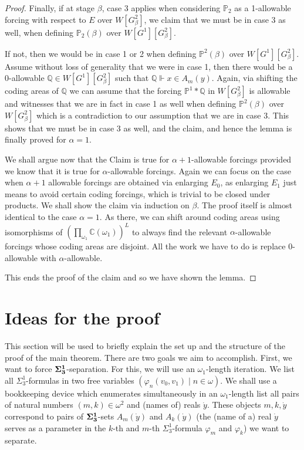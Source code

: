 \documentclass[a4paper,11pt]{article}
\newcommand{\forceP}{\mathbb{P}}
\newcommand{\forceQ}{\mathbb{Q}}
\begin{document}
\begin{proof}
Finally, if at stage $\beta$, case 3 applies when considering $\forceP_2$ as a 1-allowable forcing with respect to $E$ over $W[G^2_{\beta}]$, we claim that we must be in case 3 as well, when defining $\forceP_2 (\beta)$ over $W[G^1][G^2_{\beta}]$.

If not, then we would be in case 1 or 2 when defining $\forceP^2(
\beta)$ over $W[G^1][G^2_{\beta}]$. Assume without loss of generality that we were in case 1, then there would be a 0-allowable $\forceQ \in W[G^1][G^2_{\beta}]$ such that $\forceQ \Vdash x \in A_m(y)$. Again, via shifting the coding areas of $\forceQ$ we can assume that the forcing $\forceP^1 \ast\forceQ $ in $W[G^2_{\beta}]$ is allowable and witnesses that we are in fact in case 1 as well when defining  $\forceP^2(\beta)$ over $W[G^2_{\beta}]$ which is a contradiction to our assumption that we are in case 3. This shows that we must be in case 3 as well, and the claim, and hence the lemma is finally proved for $\alpha=1$.

 

\medskip

We shall argue now that the Claim is true for $\alpha+1$-allowable forcings provided we know that it is true for $\alpha$-allowable forcings. Again we can focus on the case when $\alpha+1$ allowable forcings are obtained via enlarging $E_0$, as enlarging $E_1$ just means to avoid certain coding forcings, which is trivial to be closed under products.
We shall show the claim via induction on $\beta$. The proof itself is almost identical to the case $\alpha=1$. As there, we can shift around coding areas using isomorphisms of $(\prod_{\omega_1} \mathbb{C} (\omega_1))^L$ to always find the relevant $\alpha$-allowable forcings whose coding areas are disjoint. All the work we have to do is replace $0$-allowable with $\alpha$-allowable.



This ends the proof of the claim and so we have shown the lemma.
\end{proof}
\section{Ideas for the proof}

This section will be used to briefly explain the set up and the structure of the proof of the main theorem.
There are two goals we aim to accomplish. First, we want to force $\bf{\Sigma}^1_3$-separation. For this, we will use an $\omega_1$-length iteration. We list all $\Sigma^1_3$-formulas in two free variables $(\varphi_n (v_0,v_1) \mid n \in \omega)$. We shall use a bookkeeping device which  enumerates simultaneously  in an $\omega_1$-length list all pairs of natural numbers $(m,k) \in \omega^2$ and (names of) reals $\dot{y}$. These objects $m,k, \dot{y}$ correspond to pairs of $\bf{\Sigma}^1_3$-sets $A_m(\dot{y}) $ and $A_k (\dot{y})$ (the (name of a) real $\dot{y}$ serves as a parameter in the $k$-th and $m$-th $\Sigma^1_3$-formula $\varphi_m$ and $\varphi_k$) we want to separate.
\end{document}
